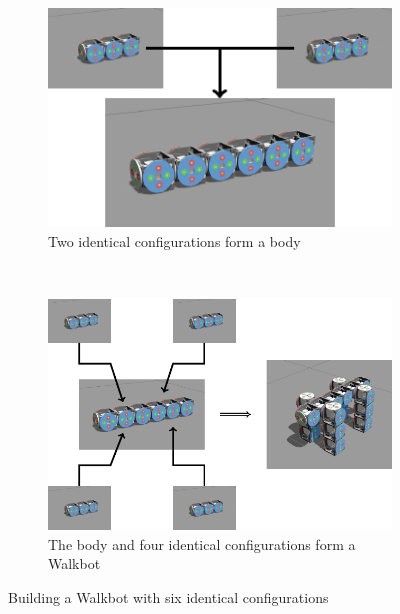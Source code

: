 \documentclass[conference]{IEEEtran}
\theoremstyle{definition}
\begin{document}
\begin{figure}
\begin{center}
        \begin{subfigure}[b]{0.7\columnwidth}
                \includegraphics[width=\textwidth]{images/tikz/walkbot.pdf}
                \caption{Two identical configurations form a body}
                \label{fig:walkbot1}
           \end{subfigure}
           ~
        \begin{subfigure}[b]{0.9\columnwidth}
                \includegraphics[width=\textwidth]{images/tikz/walkbot2.pdf}
                \caption{The body and four identical configurations form a Walkbot}
                \label{fig:walkbot2}
        \end{subfigure}
\end{center}
\caption{Building a Walkbot with six identical configurations}
\label{fig:walkbot}
\end{figure}
\end{document}
